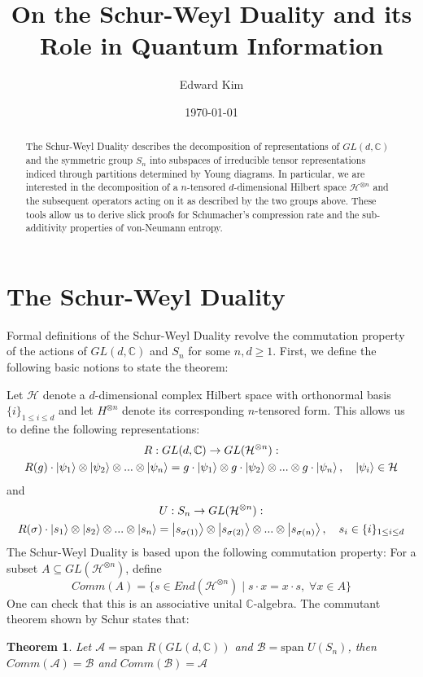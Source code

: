 \documentclass[12pt]{article}%
\newtheorem{thm}{Theorem}
\begin{document}
\title{On the Schur-Weyl Duality and its Role in Quantum Information}
\author{Edward Kim}
\date{\today}
\maketitle
\begin{abstract}
  The Schur-Weyl Duality describes the decomposition of representations of $GL(d,\mathbb{C})$ and the symmetric group $S_n$ into subspaces of irreducible tensor representations indiced through partitions determined by Young diagrams. In particular, we are interested in the decomposition of a $n$-tensored $d$-dimensional Hilbert space $\mathcal{H}^{\otimes n}$ and the subsequent operators acting on it as described by the two groups above. These tools allow us to derive slick proofs for Schumacher's compression rate and the sub-additivity properties of von-Neumann entropy.
\end{abstract}

\tableofcontents
\newpage

\section{The Schur-Weyl Duality}
Formal definitions of the Schur-Weyl Duality revolve the commutation property of the actions of $GL(d,\mathbb{C})$ and $S_n$ for some $n,d \geq 1$. First, we define the following basic notions to state the theorem:

Let $\mathcal{H}$ denote a $d$-dimensional complex Hilbert space with orthonormal basis $\{i\}_{1 \leq i \leq d}$ and let $H^{\otimes n}$ denote its corresponding $n$-tensored form.
This allows us to define the following representations:
\begin{gather*}
  R: GL(d,\mathbb{C}) \rightarrow GL(\mathcal{H}^{\otimes n}): \\
  R(g) \cdot \ket{\psi_1} \otimes \ket{\psi_2} \otimes ... \otimes \ket{\psi_n} = g \cdot \ket{\psi_1} \otimes g \cdot \ket{\psi_2} \otimes ... \otimes g \cdot \ket{\psi_n}, \quad \ket{\psi_i} \in \mathcal{H}
\end{gather*}
and
\begin{gather*}
  U: S_n \rightarrow GL(\mathcal{H}^{\otimes n}): \\
  R(\sigma) \cdot \ket{s_1} \otimes \ket{s_2} \otimes ... \otimes \ket{s_n} = \ket{s_{\sigma(1)}} \otimes \ket{s_{\sigma(2)}} \otimes ... \otimes  \ket{s_{\sigma(n)}}, \quad s_i \in \{i\}_{1 \leq i \leq d}
\end{gather*}
The Schur-Weyl Duality is based upon the following commutation property: For a subset $A \subseteq GL(\mathcal{H}^{\otimes n})$, define
$$ Comm(A) = \{s \in End(\mathcal{H}^{\otimes n})\mid s \cdot x = x \cdot s, \; \forall x \in A \} $$
One can check that this is an associative unital $\mathbb{C}$-algebra. The commutant theorem shown by Schur states that:
\begin{thm}
  Let $\mathcal{A} = \text{span }{R(GL(d,\mathbb{C}))}$ and $\mathcal{B} = \text{span }U(S_n)$, then $Comm(\mathcal{A}) = \mathcal{B}$ and $Comm(\mathcal{B}) = \mathcal{A}$
\end{thm}
\end{document}

